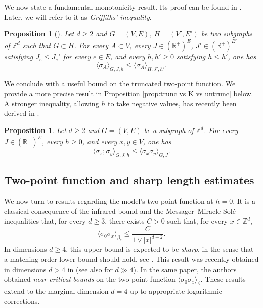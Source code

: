 \documentclass[11pt,a4paper]{article}
\numberwithin{equation}{section}
\theoremstyle{plain}
\newtheorem{Prop}[Thm]{Proposition}
\theoremstyle{definition}
\begin{document}
We now state a fundamental monotonicity result. Its proof can be found in \cite[Chapter~3]{FriedliVelenikIntroStatMech2017}. Later, we will refer to it as \emph{Griffiths' inequality}.

\begin{Prop}[]\label{prop:consequencegriffiths} Let $d\geq 2$ and $G=(V,E)$, $H=(V',E')$ be two subgraphs of $\mathbb Z^d$ such that $G\subset H$. For every $A\subset V$, every $J\in (\mathbb R^+)^E$, $J'\in (\mathbb R^+)^{E'}$ satisfying $J_e\leq J_e'$ for every $e\in E$, and every $h,h'\geq 0$ satisfying $h\leq h'$, one has
\begin{equation}\label{eq:monot Griffiths}
	\langle \sigma_A\rangle_{G,J,h}\leq \langle \sigma_A\rangle_{H,J',h'}.
\end{equation}
\end{Prop}
We conclude with a useful bound on the truncated two-point function. We provide a more precise result in Proposition \ref{prop:trunc vs K vs untrunc} below. A stronger inequality, allowing $h$ to take negative values, has recently been derived in \cite{Ding2023new}.
\begin{Prop}\label{prop: trunc is bounded by h=0} Let $d\geq 2$ and $G=(V,E)$ be a subgraph of $\mathbb Z^d$. For every $J\in (\mathbb R^+)^E$, every $h\geq 0$, and every $x,y\in V$, one has
\begin{equation}
	\langle \sigma_x;\sigma_y\rangle_{G,J,h}\leq \langle \sigma_x\sigma_y\rangle_{G,J}.
\end{equation}
\end{Prop}


\subsection{Two-point function and sharp length estimates}

We now turn to results regarding the model's two-point function at $h=0$. It is a classical consequence of the infrared bound and the Messager--Miracle-Sol\'e inequalities \cite{FrohlichSimonSpencerIRBounds1976,FrohlichIsraelLiebSimon1978,MessagerMiracleSoleInequalityIsing} that, for every $d\geq 3$, there exists $C>0$ such that, for every $x\in \mathbb Z^d$,
\begin{equation}\label{eq:IRB}
	\langle \sigma_0\sigma_x\rangle_{\beta_c}\leq \frac{C}{1\vee |x|^{d-2}}.
\end{equation}
In dimensions $d\geq 4$, this upper bound is expected to be \emph{sharp}, in the sense that a matching order lower bound should hold, see \cite{SladeTombergRGWeakPhi4in2016}. This result was recently obtained in dimensions $d>4$ in \cite{DuminilPanis2024newLB} (see also \cite{Sakai2007LaceExpIsing} for $d\gg 4$). In the same paper, the authors obtained \emph{near-critical bounds} on the two-point function $\langle \sigma_0\sigma_x\rangle_{\beta}$. These results extend to the marginal dimension $d=4$ up to appropriate logarithmic corrections. 
\end{document}
